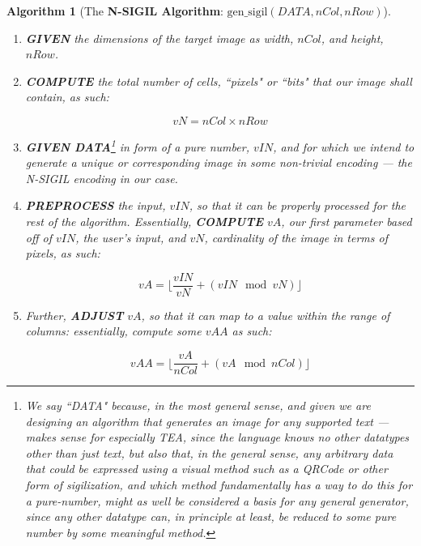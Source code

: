 \documentclass[a4paper, 18pt]{book} %
\newtheorem{alg}{Algorithm}
\begin{document}
  
  \begin{alg}[The \textbf{N-SIGIL Algorithm}: $\text{gen\_sigil}(DATA, nCol, nRow)$]
\label{ALGNSIGIL}
$ $\\
\begin{enumerate}
\item \textbf{GIVEN} the dimensions of the target image as width, $nCol$, and height, $nRow$.

\item{ \textbf{COMPUTE} the total number of cells, ``pixels" or ``bits" that our image shall contain, as such:

\begin{equation}
vN = nCol \times nRow
\end{equation}

}
\item{ \textbf{GIVEN DATA}\footnote{We say ``DATA" because, in the most general sense, and given we are designing an algorithm that generates an image for any supported text --- makes sense for especially TEA, since the language knows no other datatypes other than just text, but also that, in the general sense, any arbitrary data that could be expressed using a visual method such as a QRCode or other form of sigilization, and which method fundamentally has a way to do this for a pure-number, might as well be considered a basis for any general generator, since any other datatype can, in principle at least, be reduced to some pure number by some meaningful method.} in form of a pure number, $vIN$, and for which we intend to generate a unique or corresponding image in some non-trivial encoding --- the N-SIGIL encoding in our case.
}

\item{ \textbf{PREPROCESS} the input, $vIN$, so that it can be properly processed for the rest of the algorithm. Essentially, \textbf{COMPUTE} $vA$, our first parameter based off of $vIN$, the user's input, and $vN$, cardinality of the image in terms of pixels, as such:

\begin{equation}
vA = \lfloor \frac{vIN}{vN} + (vIN \mod vN) \rfloor
\end{equation}

}

\item{ Further, \textbf{ADJUST} $vA$, so that it can map to a value within the range of columns: essentially, compute some $vAA$ as such:

\begin{equation}
vAA =  \lfloor \frac{vA}{nCol} + (vA \mod nCol) \rfloor
\end{equation}

}
\end{enumerate}
\end{alg}
\end{document}

